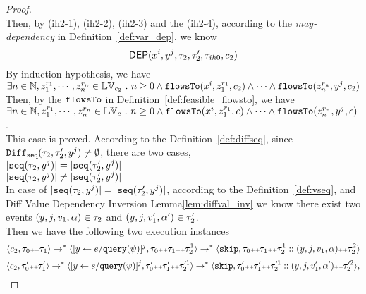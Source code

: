 \begin{proof}
\\
Then, by (ih2-1), (ih2-2), (ih2-3) and the (ih2-4), 
according to the \emph{may-dependency} in Definition~\ref{def:var_dep}, we know
\[
  \mathsf{DEP}(x^i, y^j, \mathtt{\tau}_2, \mathtt{\tau}_2', \mathtt{\tau}_{ih0}, c_2)
\] 
%
By induction hypothesis, we have 
\\
$\exists n \in \mathbb{N}, z_1^{r_1}, \cdots, z_n^{r_n} \in \mathbb{LV}_{{c_2}} ~.~ n \geq 0 \land
\mathtt{flowsTo}(x^i,  z_1^{r_1}, c_2) 
\land \cdots \land \mathtt{flowsTo}(z_n^{r_n}, y^j, c_2)$
\\
Then, by the $\mathtt{flowsTo}$ in Definition~\ref{def:feasible_flowsto}, we have 
\\
$\exists n \in \mathbb{N}, z_1^{r_1}, \cdots, z_n^{r_n} \in \mathbb{LV}_{{c}} ~.~ n \geq 0 \land
\mathtt{flowsTo}(x^i,  z_1^{r_1}, c) 
\land \cdots \land \mathtt{flowsTo}(z_n^{r_n}, y^j, c)$.
\\
This case is proved.
%
According to the Definition~\ref{def:diffseq}, since $\mathtt{Diff}_{\mathtt{seq}}(\mathtt{\tau}_2, \mathtt{\tau}_2', y^j) \neq \emptyset$, there are
two cases,
\\
$|\mathtt{seq}(\mathtt{\tau}_2, y^j)| = |\mathtt{seq}(\mathtt{\tau}_2', y^j)|$
\\
$|\mathtt{seq}(\mathtt{\tau}_2, y^j)| \neq |\mathtt{seq}(\mathtt{\tau}_2', y^j)|$
\\
In case of $|\mathtt{seq}(\mathtt{\tau}_2, y^j)| = |\mathtt{seq}(\mathtt{\tau}_2', y^j)|$, according to the Definition~\ref{def:vseq},
and {Diff Value Dependency Inversion Lemma\ref{lem:diffval_inv}} we know 
there exist two events $(y, j, v_1, \alpha) \in \mathtt{\tau}_2$ and $(y, j, v_1', \alpha') \in \mathtt{\tau}_2'$.
\\
Then we have the following two execution instances 
\\
\begin{equation}
  \label{eq:flowstosound_seq_valdep_inv1}
\langle c_2, \mathtt{\tau}_0 {\scriptscriptstyle ++} \mathtt{\tau}_1 \rangle \rightarrow^{*} 
\langle [\mathrel{ y \leftarrow e / {\tt query}(\psi) }]{}^{j}, \mathtt{\tau}_0 {\scriptscriptstyle ++} \mathtt{\tau}_1 {\scriptscriptstyle ++} \mathtt{\tau}_2^1 \rangle 
\rightarrow^* \langle \mathtt{skip}, \mathtt{\tau}_0 {\scriptscriptstyle ++} \mathtt{\tau}_1 {\scriptscriptstyle ++} \mathtt{\tau}_2^1 ::(y, j, v_1, \alpha) {\scriptscriptstyle ++} \mathtt{\tau}_2^2 \rangle  
\end{equation}
%
\begin{equation}
  \label{eq:flowstosound_seq_valdep_inv2}
\config{c_2, \trace_0' \tracecat \trace_1'} \rightarrow^{*} 
\config{[\assign{y}{\expr / \query(\qexpr)}]{}^{j}, \trace_0' \tracecat \trace_1' \tracecat \trace'^1_2} 
\rightarrow^* \config{\eskip, \trace_0' \tracecat \trace_1' \tracecat \trace'^1_2 ::(y, j, v_1', \qval') \tracecat \trace'^2_2},

\end{equation}
\end{proof}
